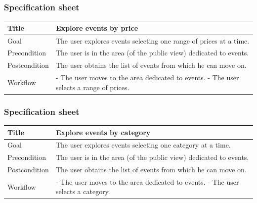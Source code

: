 \documentclass{beamer}
\begin{document}
\begin{frame}
    \frametitle{Specification sheet}
    \begin{table}
        \tiny
        \begin{tabular}{|p{2cm}|p{6cm}|}
        \hline
        Title & \textbf{Explore events by price} \\
        \hline
        Goal & The user explores events selecting one range of prices at a time. \\
        \hline
        Precondition & The user is in the area (of the public view) dedicated to events.\\
        \hline
        Postcondition & The user obtains the list of events from which he can move on.\\
        \hline
        Workflow &
        - The user moves to the area dedicated to events. \newline
        - The user selects a range of prices. \\
        \hline
        \end{tabular}
\end{table}
\end{frame}

\begin{frame}
    \frametitle{Specification sheet}
    \begin{table}
        \tiny
        \begin{tabular}{|p{2cm}|p{6cm}|}
        \hline
        Title & \textbf{Explore events by category} \\
        \hline
        Goal & The user explores events selecting one category at a time. \\
        \hline
        Precondition & The user is in the area (of the public view) dedicated to events.\\
        \hline
        Postcondition & The user obtains the list of events from which he can move on.\\
        \hline
        Workflow &
        - The user moves to the area dedicated to events. \newline
        - The user selects a category. \\
        \hline
        \end{tabular}
\end{table}
\end{frame}
\end{document}
